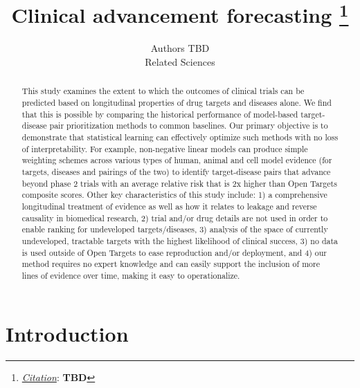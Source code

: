 \documentclass{article}
\title{Clinical advancement forecasting
\thanks{\textit{\underline{Citation}}: 
\textbf{TBD}} 
}
\author{
  Authors TBD \\
  Related Sciences \\
}
\begin{document}
\maketitle

\begin{abstract}
This study examines the extent to which the outcomes of clinical trials can be predicted based on longitudinal properties of drug targets and diseases alone. We find that this is possible by comparing the historical performance of model-based target-disease pair prioritization methods to common baselines. Our primary objective is to demonstrate that statistical learning can effectively optimize such methods with no loss of interpretability. For example, non-negative linear models can produce simple weighting schemes across various types of human, animal and cell model evidence (for targets, diseases and pairings of the two) to identify target-disease pairs that advance beyond phase 2 trials with an average relative risk that is 2x higher than Open Targets composite scores. Other key characteristics of this study include: 1) a comprehensive longitudinal treatment of evidence as well as how it relates to leakage and reverse causality in biomedical research, 2) trial and/or drug details are not used in order to enable ranking for undeveloped targets/diseases, 3) analysis of the space of currently undeveloped, tractable targets with the highest likelihood of clinical success, 3) no data is used outside of Open Targets to ease reproduction and/or deployment, and 4) our method requires no expert knowledge and can easily support the inclusion of more lines of evidence over time, making it easy to operationalize.
\end{abstract}

\section{Introduction}
\end{document}

